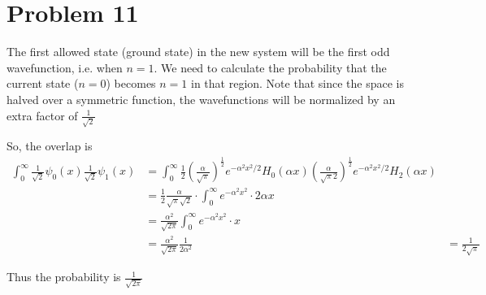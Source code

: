 \documentclass[12pt]{article}
\begin{document}
\section*{Problem 11}
The first allowed state (ground state) in the new system will be the first odd wavefunction, i.e. when $n=1$. We need to calculate the probability that the current state ($n=0$) becomes $n=1$ in that region. Note that since the space is halved over a symmetric function, the wavefunctions will be normalized by an extra factor of $\frac1{\sqrt2}$

So, the overlap is 
\begin{align*}
\int_0^\infty \frac1{\sqrt2}\psi_0(x)\frac1{\sqrt2}\psi_1(x)
&= \int_0^\infty \frac1{2} \left(\frac{\alpha}{\sqrt{\pi}}\right)^{\frac12}e^{-\alpha^2x^2/2}H_0(\alpha x)\left(\frac{\alpha}{\sqrt{\pi}2}\right)^\frac12 e^{-\alpha^2x^2/2}H_2(\alpha x)\\
&= \frac1{2}\frac{\alpha}{\sqrt\pi\sqrt2}\cdot \int_0^\infty e^{-\alpha^2x^2}\cdot 2\alpha x\\
&=\frac{\alpha^2}{\sqrt{2\pi}} \int_0^\infty e^{-\alpha^2x^2}\cdot  x\\
&=\frac{\alpha^2}{\sqrt{2\pi}}\frac{1}{2\alpha^2}
&=\frac{1}{2\sqrt\pi}
\end{align*}

Thus the probability is $\frac1{\sqrt{2\pi}}$
\end{document}

